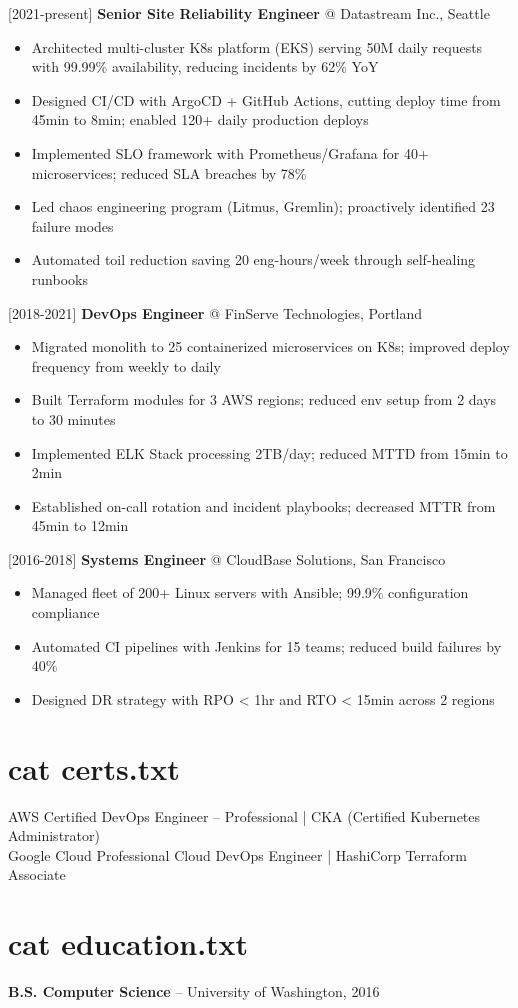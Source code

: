 \documentclass[9.5pt,a4paper]{article}
\begin{document}
{\color{termgreen}[2021-present]} \textbf{Senior Site Reliability Engineer} @ Datastream Inc., Seattle
\begin{itemize}
  \item Architected multi-cluster K8s platform (EKS) serving 50M daily requests with 99.99\% availability, reducing incidents by 62\% YoY
  \item Designed CI/CD with ArgoCD + GitHub Actions, cutting deploy time from 45min to 8min; enabled 120+ daily production deploys
  \item Implemented SLO framework with Prometheus/Grafana for 40+ microservices; reduced SLA breaches by 78\%
  \item Led chaos engineering program (Litmus, Gremlin); proactively identified 23 failure modes
  \item Automated toil reduction saving 20 eng-hours/week through self-healing runbooks
\end{itemize}

{\color{termgreen}[2018-2021]} \textbf{DevOps Engineer} @ FinServe Technologies, Portland
\begin{itemize}
  \item Migrated monolith to 25 containerized microservices on K8s; improved deploy frequency from weekly to daily
  \item Built Terraform modules for 3 AWS regions; reduced env setup from 2 days to 30 minutes
  \item Implemented ELK Stack processing 2TB/day; reduced MTTD from 15min to 2min
  \item Established on-call rotation and incident playbooks; decreased MTTR from 45min to 12min
\end{itemize}

{\color{termgreen}[2016-2018]} \textbf{Systems Engineer} @ CloudBase Solutions, San Francisco
\begin{itemize}
  \item Managed fleet of 200+ Linux servers with Ansible; 99.9\% configuration compliance
  \item Automated CI pipelines with Jenkins for 15 teams; reduced build failures by 40\%
  \item Designed DR strategy with RPO < 1hr and RTO < 15min across 2 regions
\end{itemize}

\section{cat certs.txt}
AWS Certified DevOps Engineer -- Professional | CKA (Certified Kubernetes Administrator)\\
Google Cloud Professional Cloud DevOps Engineer | HashiCorp Terraform Associate

\section{cat education.txt}
\textbf{B.S. Computer Science} -- University of Washington, 2016
\end{document}
